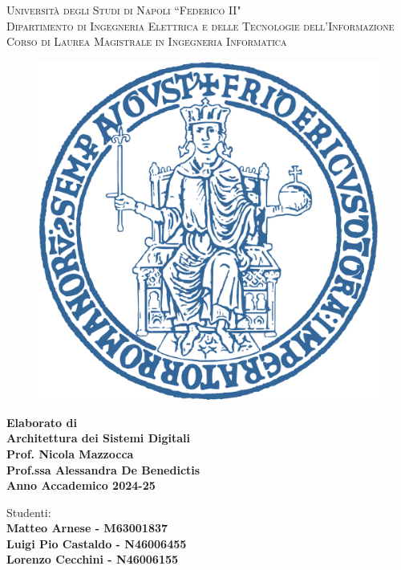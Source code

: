\begin{titlepage}
    \begin{center}
        {\Large \textsc{Università degli Studi di Napoli ``Federico II"}}\\
        \bigskip
        {\large \textsc{Dipartimento di Ingegneria Elettrica e delle Tecnologie dell'Informazione}}\\
        \bigskip
        {\large \textsc{Corso di Laurea Magistrale in Ingegneria Informatica}}\\
        \bigskip
        \begin{figure}[h]
            \centering
            \includegraphics[width=0.5\linewidth]{img/unina_logo.png}
            \label{fig:unina_logo}
        \end{figure}
        \bigskip
        {\Large \textbf{Elaborato di}}\\
        \medskip
        {\Huge \textbf{Architettura dei Sistemi Digitali}}\\
        \smallskip
        {\large \textbf{Prof. Nicola Mazzocca}}\\
        {\large \textbf{Prof.ssa Alessandra De Benedictis}}\\
        \smallskip
        {\textbf{Anno Accademico 2024-25}}\\
        \vfill
    \end{center}
    \begin{flushright}
        {\large Studenti:}\\
        \smallskip
        {\large \textbf{Matteo Arnese - M63001837}}\\
        {\large \textbf{Luigi Pio Castaldo - N46006455}}\\
        {\large \textbf{Lorenzo Cecchini - N46006155}}
    \end{flushright}
\end{titlepage}